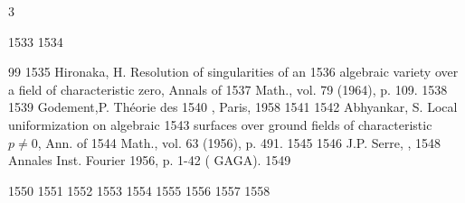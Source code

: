 3	\documentclass[10pt]{../fichiers-configuration-latex/smfart}
\begin{document}
  1533	
  1534	\begin{thebibliography}{99}
  1535	 Hironaka, H. Resolution of singularities of an
  1536	algebraic variety over a field of characteristic zero, Annals of
  1537	Math., vol. 79 (1964), p. 109.
  1538	
  1539	 Godement,\pageoriginale P. Théorie des
  1540	, Paris, 1958
  1541	
  1542	 Abhyankar, S. Local uniformization on algebraic
  1543	surfaces over ground fields of characteristic $p\neq 0$, Ann. of
  1544	Math., vol. 63 (1956), p. 491.
  1545	
  1546	 J.P. Serre, ,
  1548	Annales Inst. Fourier 1956, p. 1-42 ( GAGA).
  1549	\end{thebibliography}
  1550	
  1551	%
  1552	%
  1553	%
  1554	%
  1555	%
  1556	%
  1557	
  1558	\ifx\danslelivre{}	
\end{document}
